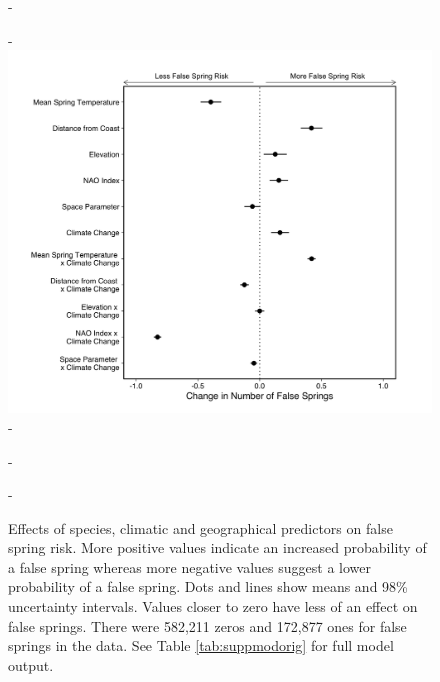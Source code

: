 \documentclass{article}\usepackage[]{graphicx}\usepackage[]{color}
\begin{document}
  
{\begin{figure} [H]
  -\begin{center}
  -\includegraphics[width=12cm]{..//analyses/figures/model_output_98_orig.png}
  -\caption{Effects of species, climatic and geographical predictors on false spring risk. More positive values indicate an increased probability of a false spring whereas more negative values suggest a lower probability of a false spring. Dots and lines show means and 98\% uncertainty intervals. Values closer to zero have less of an effect on false springs. There were 582,211 zeros and 172,877 ones for false springs in the data. See Table \ref{tab:suppmodorig} for full model output.}\label{fig:maineffects}
  -\end{center}
  -\end{figure}}
\end{document}
